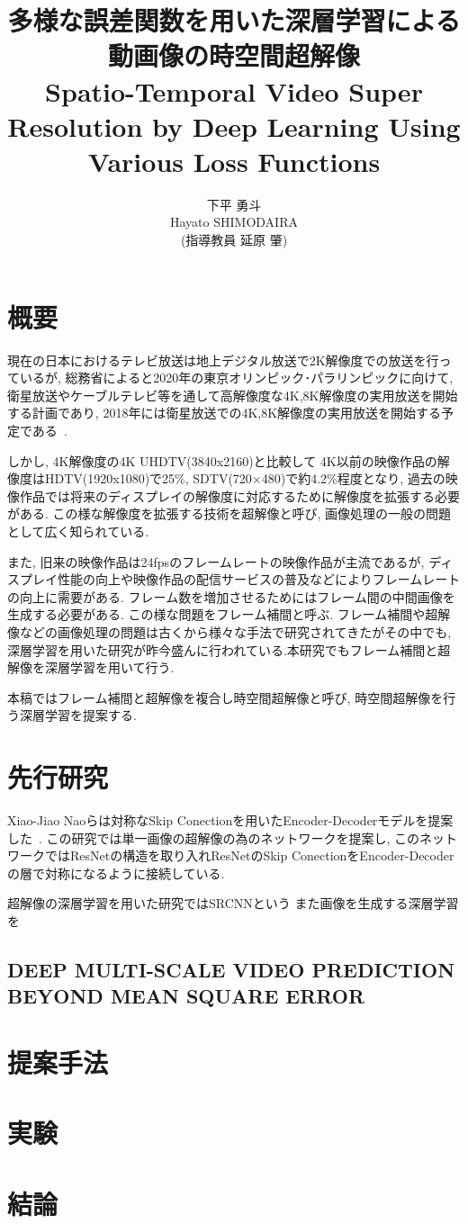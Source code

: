 \documentclass[twocolumn,a4j,uplatex]{jsarticle}
\title{{\Large 多様な誤差関数を用いた深層学習による動画像の時空間超解像} \\
Spatio-Temporal Video Super Resolution by Deep Learning Using Various Loss Functions}
\author{{\Large 下平 勇斗} \\ Hayato SHIMODAIRA \\ (指導教員 延原 肇)}
\begin{document}
\maketitle
\thispagestyle{headings}
\section{概要}
現在の日本におけるテレビ放送は地上デジタル放送で2K解像度での放送を行っているが,
総務省によると2020年の東京オリンピック･パラリンピックに向けて,
衛星放送やケーブルテレビ等を通して高解像度な4K,8K解像度の実用放送を開始する計画であり,
2018年には衛星放送での4K,8K解像度の実用放送を開始する予定である~\cite{soumu}.

しかし, 4K解像度の4K UHDTV(3840x2160)と比較して
4K以前の映像作品の解像度はHDTV(1920x1080)で25\%, SDTV(720×480)で約4.2\%程度となり,
過去の映像作品では将来のディスプレイの解像度に対応するために解像度を拡張する必要がある.
この様な解像度を拡張する技術を超解像と呼び, 画像処理の一般の問題として広く知られている.

また, 旧来の映像作品は24fpsのフレームレートの映像作品が主流であるが,
ディスプレイ性能の向上や映像作品の配信サービスの普及などによりフレームレートの向上に需要がある.
フレーム数を増加させるためにはフレーム間の中間画像を生成する必要がある.
この様な問題をフレーム補間と呼ぶ.
フレーム補間や超解像などの画像処理の問題は古くから様々な手法で研究されてきたがその中でも,
深層学習を用いた研究が昨今盛んに行われている.本研究でもフレーム補間と超解像を深層学習を用いて行う.

本稿ではフレーム補間と超解像を複合し時空間超解像と呼び, 時空間超解像を行う深層学習を提案する.
\section{先行研究}
Xiao-Jiao Naoらは対称なSkip Conectionを用いたEncoder-Decoderモデルを提案した~\cite{DBLP:conf/nips/2016}.
この研究では単一画像の超解像の為のネットワークを提案し,
このネットワークではResNetの構造を取り入れResNetのSkip ConectionをEncoder-Decoderの層で対称になるように接続している.

超解像の深層学習を用いた研究ではSRCNNという
また画像を生成する深層学習を
\subsection*{DEEP MULTI-SCALE VIDEO PREDICTION BEYOND MEAN SQUARE ERROR}
\section{提案手法}
\section{実験}
\section{結論}



\end{document}
